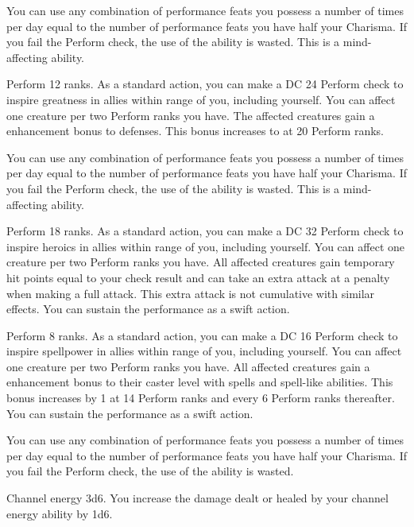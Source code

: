 You can use any combination of performance feats you possess a number of times per day equal to the number of performance feats you have \add half your Charisma. If you fail the Perform check, the use of the ability is wasted. This is a mind-affecting ability.

\featpre Perform 12 ranks.
\featben As a standard action, you can make a DC 24 Perform check to inspire greatness in allies within \rngmed range of you, including yourself. You can affect one creature per two Perform ranks you have. The affected creatures gain a  enhancement bonus to defenses. This bonus increases to  at 20 Perform ranks.

You can use any combination of performance feats you possess a number of times per day equal to the number of performance feats you have \add half your Charisma. If you fail the Perform check, the use of the ability is wasted. This is a mind-affecting ability.

\featpre Perform 18 ranks.
\featben As a standard action, you can make a DC 32 Perform check to inspire heroics in allies within \rngmed range of you, including yourself. You can affect one creature per two Perform ranks you have. All affected creatures gain temporary hit points equal to your check result and can take an extra attack at a  penalty when making a full attack. This extra attack is not cumulative with similar effects. You can sustain the performance as a swift action.

\featpre Perform 8 ranks.
\featben As a standard action, you can make a DC 16 Perform check to inspire spellpower in allies within \rngmed range of you, including yourself. You can affect one creature per two Perform ranks you have. All affected creatures gain a  enhancement bonus to their caster level with spells and spell-like abilities. This bonus increases by 1 at 14 Perform ranks and every 6 Perform ranks thereafter. You can sustain the performance as a swift action.

You can use any combination of performance feats you possess a number of times per day equal to the number of performance feats you have \add half your Charisma. If you fail the Perform check, the use of the ability is wasted.

 Channel energy 3d6.
 You increase the damage dealt or healed by your channel energy ability by 1d6.

